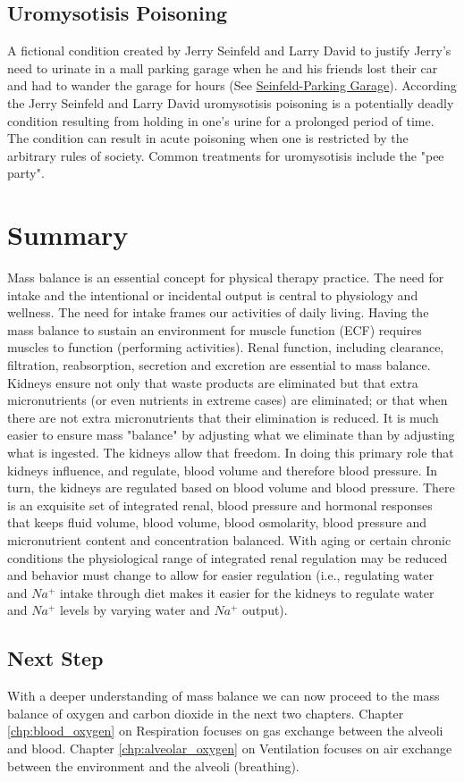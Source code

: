 \subsection{Uromysotisis Poisoning}

A fictional condition created by Jerry Seinfeld and Larry David to justify Jerry's need to urinate in a mall parking garage when he and his friends lost their car and had to wander the garage for hours (See \href{https://www.youtube.com/watch?v=OG6b7KJ1Ah0}{Seinfeld-Parking Garage}). According the Jerry Seinfeld and Larry David uromysotisis poisoning is a potentially deadly condition resulting from holding in one's urine for a prolonged period of time. The condition can result in acute poisoning when one is restricted by the arbitrary rules of society. Common treatments for uromysotisis include the "pee party".

\section{Summary}
Mass balance is an essential concept for physical therapy practice. The need for intake and the intentional or incidental output is central to physiology and wellness. The need for intake frames our activities of daily living. Having the mass balance to sustain an environment for muscle function (ECF) requires muscles to function (performing activities). Renal function, including clearance, filtration, reabsorption, secretion and excretion are essential to mass balance. Kidneys ensure not only that waste products are eliminated but that extra micronutrients (or even nutrients in extreme cases) are eliminated; or that when there are not extra micronutrients that their elimination is reduced. It is much easier to ensure mass "balance" by adjusting what we eliminate than by adjusting what is ingested. The kidneys allow that freedom. In doing this primary role that kidneys influence, and regulate, blood volume and therefore blood pressure. In turn, the kidneys are regulated based on blood volume and blood pressure. There is an exquisite set of integrated renal, blood pressure and hormonal responses that keeps fluid volume, blood volume, blood osmolarity, blood pressure and micronutrient content and concentration balanced. With aging or certain chronic conditions the physiological range of integrated renal regulation may be reduced and behavior must change to allow for easier regulation (i.e., regulating water and $Na^+$ intake through diet makes it easier for the kidneys to regulate water and $Na^+$ levels by varying water and $Na^+$ output).

\subsection{Next Step}

With a deeper understanding of mass balance we can now proceed to the mass balance of oxygen and carbon dioxide in the next two chapters. Chapter \ref{chp:blood_oxygen} on Respiration focuses on gas exchange between the alveoli and blood. Chapter \ref{chp:alveolar_oxygen} on Ventilation focuses on air exchange between the environment and the alveoli (breathing).



\printbibliography[heading=subbibintoc]